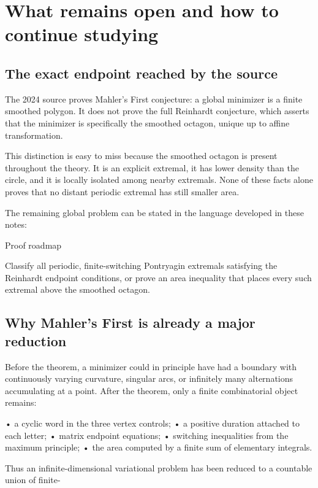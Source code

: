 \chapter{What remains open and how to continue studying}
\section{The exact endpoint reached by the source}

The 2024 source proves Mahler’s First conjecture: a global minimizer is a finite smoothed polygon. It does not prove the full Reinhardt conjecture, which asserts that the minimizer is specifically the smoothed octagon, unique up to affine transformation.


This distinction is easy to miss because the smoothed octagon is present throughout the theory. It is an explicit extremal, it has lower density than the circle, and it is locally isolated among nearby extremals. None of these facts alone proves that no distant periodic extremal has still smaller area.


The remaining global problem can be stated in the language developed in these notes:


\begin{insightbox}{Proof roadmap}
\end{insightbox}

Classify all periodic, finite-switching Pontryagin extremals satisfying the Reinhardt endpoint conditions, or prove an area inequality that places every such extremal above the smoothed octagon.


\section{Why Mahler’s First is already a major reduction}

Before the theorem, a minimizer could in principle have had a boundary with continuously varying curvature, singular arcs, or infinitely many alternations accumulating at a point. After the theorem, only a finite combinatorial object remains:


• a cyclic word in the three vertex controls; • a positive duration attached to each letter; • matrix endpoint equations; • switching inequalities from the maximum principle; • the area computed by a finite sum of elementary integrals.


Thus an infinite-dimensional variational problem has been reduced to a countable union of finite-


